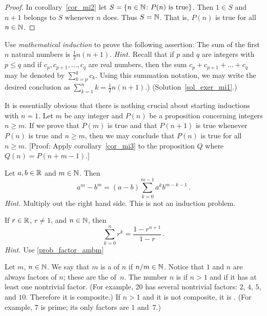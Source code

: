 \begin{proof}  In corollary~\ref{cor_mi2} let $S = \{n \in \mathbb{N} \colon P(n) \text{ is true}\}$.
Then $1 \in S$ and $n + 1$ belongs to $S$ whenever $n$ does.  Thus $S = \mathbb{N}$.  That is, $P(n)$
is true for all $n \in \mathbb{N}$.
\end{proof}

\begin{exer}\label{exer_mi1}  Use \emph{mathematical induction} to prove the following assertion:
The sum of the first $n$ natural numbers is $\frac 12n(n+1)$.  \emph{Hint.}  Recall that if
$p$ and $q$ are integers with $p \le q$ and if $c_p, c_{p+1}, \dots, c_q$ are real numbers,
then the sum $c_p + c_{p+1} + \dots + c_q$ may be denoted by $\sum_{k=p}^q c_k$. Using this
summation notation, we may write the desired conclusion as $\sum_{k=1}^n k = \frac 12
n(n+1)$.)  (Solution~\ref{sol_exer_mi1}.)
\end{exer}

It is essentially obvious that there is nothing crucial about starting inductions with $n =
1$. Let $m$ be any integer and $P(n)$ be a proposition concerning integers $n \ge m$.  If we
prove that $P(m)$ is true and that $P(n + 1)$ is true whenever $P(n)$ is true and $n \ge m$,
then we may conclude that $P(n)$ is true for all $n \ge m$. [Proof: Apply
corollary~\ref{cor_mi3} to the proposition $Q$  where $Q(n) = P(n + m - 1)$.]

\begin{prob}\label{prob_factor_ambm}  Let $a,b \in \mathbb{R}$ and $m \in \mathbb{N}$.  Then
  \[ a^m - b^m = (a - b) \sum_{k=0}^{m-1} a^k b^{m-k-1}\,. \]
\emph{Hint.}  Multiply out the right hand side. This is not an induction problem.
\end{prob}

\begin{prob}\label{prob_geomser1} If $r \in \mathbb{R}$, $r \ne 1$, and $n \in \mathbb{N}$, then
  \[ \sum_{k=0}^n r^k = \frac{1 - r^{n+1}}{1 - r}\,. \]
\emph{Hint.}  Use \ref{prob_factor_ambm}
\end{prob}

\begin{defn}  Let  $m$, $n \in \mathbb{N}$. We say that $m$ is a
 of $n$ if $n/m \in \mathbb{N}$.  Notice that  $1$ and $n$ are always factors of $n$; these
are the
 of~$n$.  The number $n$ is
 if $n > 1$ and if it has at least one nontrivial factor. (For example, $20$ has
several nontrivial factors: $2$, $4$, $5$, and $10$.  Therefore it is composite.) If $n > 1$
and it is not composite, it is
.  (For example, $7$ is prime; its only factors are $1$ and~$7$.)
\end{defn}

